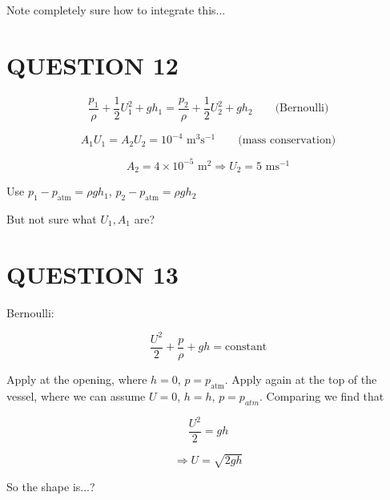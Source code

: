 \documentclass[a4paper]{article}
\begin{document}
Note completely sure how to integrate this...





\section{QUESTION 12}

\[ \frac{p_{1}}{\rho} + \frac{1}{2} U_{1}^{2} + g h_{1} = \frac{p_{2}}{\rho} + \frac{1}{2} U_{2}^{2} + g h_{2} \qquad \text{(Bernoulli)} \]


\[ A_{1} U_{1} = A_{2} U_{2} = 10^{-4} \text{ m}^{3} \text{s}^{-1} \qquad \text{(mass conservation)} \]

\[ A_{2} = 4 \times 10^{-5} \text{ m}^{2} \Rightarrow U_{2} = 5\text{ ms}^{-1} \]

Use $ p_{1} - p_{\text{atm}} = \rho g h_{1} $, $ p_{2} - p_{\text{atm}} = \rho g h_{2} $ 

But not sure what $ U_{1}, A_{1} $ are?

\section{QUESTION 13}

Bernoulli:

\[ \frac{U^{2}}{2} + \frac{p}{\rho} + gh = \text{constant} \]

Apply at the opening, where $ h = 0 $, $ p = p_{\text{atm}} $. Apply again at the top of the vessel, where we can assume $ U = 0 $, $ h = h $, $ p = p_{atm} $. Comparing we find that 

\[ \frac{U^{2}}{2}  = gh  \]

\[ \Rightarrow U = \sqrt{2gh} \]

So the shape is...?
\end{document}
